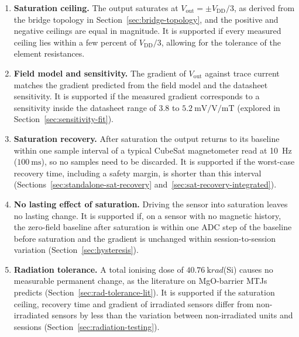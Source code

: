 \documentclass[12pt,a4paper]{article}
\begin{document}
\begin{enumerate}[label=\textbf{H\arabic*:}, leftmargin=*]
\item \textbf{Saturation ceiling.} The output saturates at $V_{\text{out}} = \pm V_{\text{DD}}/3$, as derived from the bridge topology in Section~\ref{sec:bridge-topology}, and the positive and negative ceilings are equal in magnitude. It is supported if every measured ceiling lies within a few percent of $V_{\text{DD}}/3$, allowing for the tolerance of the element resistances.

\item \textbf{Field model and sensitivity.} The gradient of $V_{\text{out}}$ against trace current matches the gradient predicted from the field model and the datasheet sensitivity. It is supported if the measured gradient corresponds to a sensitivity inside the datasheet range of 3.8 to $\SI{5.2}{\milli\volt\per\volt\per\milli\tesla}$ (explored in Section~\ref{sec:sensitivity-fit}).

\item \textbf{Saturation recovery.} After saturation the output returns to its baseline within one sample interval of a typical CubeSat magnetometer read at \SI{10}{\hertz} ($\SI{100}{\milli\second}$), so no samples need to be discarded. It is supported if the worst-case recovery time, including a safety margin, is shorter than this interval (Sections~\ref{sec:standalone-sat-recovery} and~\ref{sec:sat-recovery-integrated}).

\item \textbf{No lasting effect of saturation.} Driving the sensor into saturation leaves no lasting change. It is supported if, on a sensor with no magnetic history, the zero-field baseline after saturation is within one ADC step of the baseline before saturation and the gradient is unchanged within session-to-session variation (Section~\ref{sec:hysteresis}).

\item \textbf{Radiation tolerance.} A total ionising dose of $\SI{40.76}{\kilo rad}$(Si) causes no measurable permanent change, as the literature on MgO-barrier MTJs predicts (Section~\ref{sec:rad-tolerance-lit}). It is supported if the saturation ceiling, recovery time and gradient of irradiated sensors differ from non-irradiated sensors by less than the variation between non-irradiated units and sessions (Section~\ref{sec:radiation-testing}).


\end{enumerate}
\end{document}
